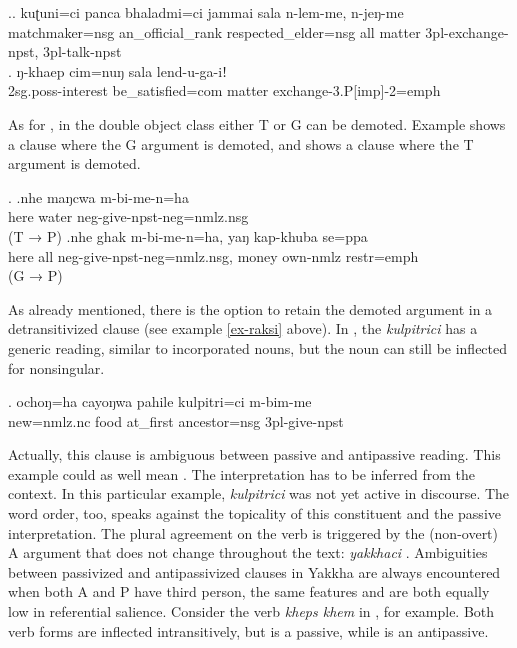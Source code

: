 \ex.\ag. kuʈuni=ci panca bhaladmi=ci jammai sala   n-lem-me, n-jeŋ-me\\
	matchmaker{\sc =nsg} an\_official\_rank  respected\_elder{\sc =nsg} all matter {\sc 3pl-}exchange{\sc -npst}, {\sc 3pl-}talk{\sc -npst}		\\
	 
\bg. ŋ-khaep cim=nuŋ sala lend-u-ga-iǃ\\
	{\sc 2sg.poss-}interest be\_satisfied{\sc =com} matter exchange{\sc -3.P[imp]-2=emph}\\

As for , in the double object class  either T or  G can be demoted. Example \Next[a] shows a clause where the G argument is demoted, and \Next[b] shows a clause where the T argument is demoted.  

\ex. \ag.nhe maŋcwa m-bi-me-n=ha\\
here water {\sc neg-}give{\sc [3sg]-npst-neg=nmlz.nsg}	\\
 (T → P)
 \bg.nhe ghak m-bi-me-n=ha, yaŋ kap-khuba se=ppa\\
here all {\sc neg-}give{\sc [3sg]-npst-neg=nmlz.nsg}, money own{\sc -nmlz} {\sc restr=emph} \\
 (G → P)


As already mentioned, there is  the option to retain the demoted argument in a  detransitivized clause (see example \ref{ex-raksi} above). In \Next, the  \emph{kulpitrici} has a generic reading, similar to incorporated nouns, but the noun can still be inflected for nonsingular. 

\exg. ochoŋ=ha cayoŋwa  pahile   kulpitri=ci  m-bim-me\\
new{\sc =nmlz.nc} food at\_first ancestor{\sc =nsg} {\sc 3pl-}give{\sc -npst}\\
 

Actually, this clause is ambiguous between passive and antipassive reading. This example could as well mean . The interpretation has to be inferred from the context. In this particular example, \emph{kulpitrici} was not yet active in discourse. The word order, too, speaks against the topicality of this constituent and the passive interpretation. The plural agreement on the verb is triggered by the (non-overt) A argument that does not change throughout the text: \emph{yakkhaci} . Ambiguities between passivized and antipassivized clauses in Yakkha are always encountered when both A and P have third person, the same  features and are both equally low in referential salience. Consider the verb \emph{kheps \ti khem}  in \Next, for example. Both verb forms are inflected intransitively, but \Next[a] is a passive, while \Next[b] is an antipassive.

